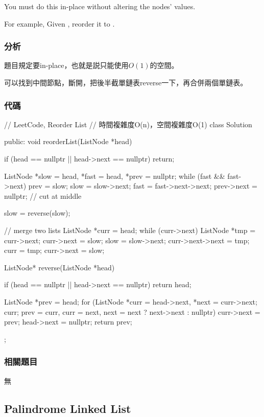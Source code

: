 You must do this in-place without altering the nodes' values.

For example,
Given , reorder it to .


\subsubsection{分析}
題目規定要in-place，也就是説只能使用$O(1)$的空間。

可以找到中間節點，斷開，把後半截單鏈表reverse一下，再合併兩個單鏈表。


\subsubsection{代碼}
\begin{Code}
// LeetCode, Reorder List
// 時間複雜度O(n)，空間複雜度O(1)
class Solution {
public:
    void reorderList(ListNode *head) {
        if (head == nullptr || head->next == nullptr) return;

        ListNode *slow = head, *fast = head, *prev = nullptr;
        while (fast && fast->next) {
            prev = slow;
            slow = slow->next;
            fast = fast->next->next;
        }
        prev->next = nullptr; // cut at middle

        slow = reverse(slow);

        // merge two lists
        ListNode *curr = head;
        while (curr->next) {
            ListNode *tmp = curr->next;
            curr->next = slow;
            slow = slow->next;
            curr->next->next = tmp;
            curr = tmp;
        }
        curr->next = slow;
    }

    ListNode* reverse(ListNode *head) {
        if (head == nullptr || head->next == nullptr) return head;

        ListNode *prev = head;
        for (ListNode *curr = head->next, *next = curr->next; curr;
            prev = curr, curr = next, next = next ? next->next : nullptr) {
                curr->next = prev;
        }
        head->next = nullptr;
        return prev;
    }
};
\end{Code}


\subsubsection{相關題目}
\begindot
\item 無
\myenddot

\subsection{Palindrome Linked List}
\label{sec:palindrome-list}


